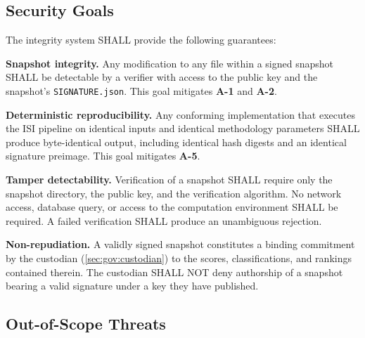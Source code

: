 \subsection{Security Goals}\label{sec:threat:goals}

The integrity system SHALL provide the following guarantees:

\begin{description}[style=nextline, leftmargin=3.5em, labelwidth=3em]

  \item[\textbf{G-1}] \textbf{Snapshot integrity.}\enspace
    Any modification to any file within a signed snapshot SHALL be
    detectable by a verifier with access to the public key and the
    snapshot's \texttt{SIGNATURE.json}.  This goal mitigates \textbf{A-1}
    and \textbf{A-2}.

  \item[\textbf{G-2}] \textbf{Deterministic reproducibility.}\enspace
    Any conforming implementation that executes the ISI pipeline on
    identical inputs and identical methodology parameters SHALL produce
    byte-identical output, including identical hash digests and an
    identical signature preimage.  This goal mitigates \textbf{A-5}.

  \item[\textbf{G-3}] \textbf{Tamper detectability.}\enspace
    Verification of a snapshot SHALL require only the snapshot directory,
    the public key, and the verification algorithm.  No network access,
    database query, or access to the computation environment SHALL be
    required.  A failed verification SHALL produce an unambiguous rejection.

  \item[\textbf{G-4}] \textbf{Non-repudiation.}\enspace
    A validly signed snapshot constitutes a binding commitment by the
    custodian (\cref{sec:gov:custodian}) to the scores, classifications,
    and rankings contained therein.  The custodian SHALL NOT deny
    authorship of a snapshot bearing a valid signature under a key they
    have published.

\end{description}

\subsection{Out-of-Scope Threats}\label{sec:threat:out-of-scope}

